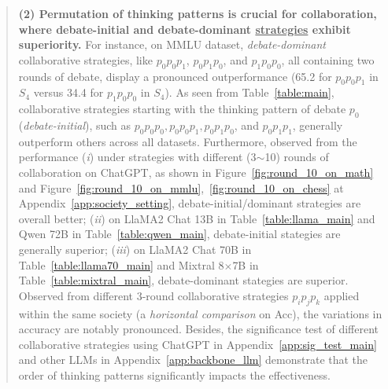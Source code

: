 \documentclass[11pt]{article}
\begin{document}
\begin{abstract}
\textbf{
(2)  
Permutation of thinking patterns is crucial for collaboration, where debate-initial and debate-dominant \underline{strategies} exhibit superiority.
} 
For instance, on MMLU dataset, \emph{debate-dominant} collaborative strategies, like $p_0p_0p_1$, $p_0p_1p_0$, and $p_1p_0p_0$, all containing two rounds of debate, display a pronounced outperformance (65.2 for $p_0p_0p_1$ in $S_4$ versus 34.4 for $p_1p_0p_0$ in $S_4$). 
As seen from Table~\ref{table:main}, collaborative strategies starting with the thinking pattern of debate $p_0$ (\emph{debate-initial}), such as $p_0p_0p_0, p_0p_0p_1, p_0p_1p_0$, and $p_0p_1p_1$, generally outperform others across all datasets. 
Furthermore, observed from the performance
(\emph{i}) under strategies with different (3$\sim$10) rounds of collaboration on ChatGPT, as shown in Figure~\ref{fig:round_10_on_math} and Figure~\ref{fig:round_10_on_mmlu},~\ref{fig:round_10_on_chess} at Appendix~\ref{app:society_setting}, debate-initial/dominant strategies are overall better; 
(\emph{ii}) on LlaMA2 Chat 13B in Table~\ref{table:llama_main} and Qwen 72B in Table~\ref{table:qwen_main}, debate-initial stategies are generally superior; 
(\emph{iii}) on LlaMA2 Chat 70B in Table~\ref{table:llama70_main} and Mixtral 8$\times$7B in Table~\ref{table:mixtral_main}, debate-dominant stategies are superior. 
Observed from different 3-round collaborative strategies $p_ip_jp_k$ applied within the same society (a \emph{horizontal comparison} on Acc), the variations in accuracy are notably pronounced. 
Besides, the significance test of different collaborative strategies using ChatGPT in Appendix~\ref{app:sig_test_main} and other LLMs in Appendix~\ref{app:backbone_llm} demonstrate that the order of thinking patterns significantly impacts the effectiveness.  


\end{abstract}
\end{document}
